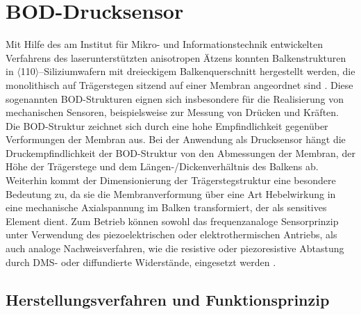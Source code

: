 \section{BOD-Drucksensor}
\label{BOD}


Mit Hilfe des am Institut für Mikro- und Informationstechnik entwickelten
Verfahrens des laserunterstützten anisotropen Ätzens \cite{Ala91} konnten
Balkenstrukturen
in $\langle$110$\rangle$--Siliziumwafern mit dreieckigem Balkenquerschnitt
hergestellt werden, die monolithisch auf Trägerstegen sitzend auf einer
Membran angeordnet sind \cite{Sch93b}. Diese sogenannten BOD-Strukturen
eignen sich insbesondere für die Realisierung von mechanischen Sensoren,
beispielsweise zur Messung von Drücken und Kräften.
Die BOD-Struktur zeichnet sich durch eine hohe Empfindlichkeit gegenüber
Verformungen der Membran aus. Bei der Anwendung als Drucksensor hängt die
Druckempfindlichkeit der BOD-Struktur von den Abmessungen der
Membran, der Höhe der Trägerstege und dem Längen-/Dickenverhältnis des
Balkens ab. Weiterhin kommt der Dimensionierung der Trägerstegstruktur
eine besondere Bedeutung zu, da sie die Membranverformung über eine Art
Hebelwirkung in eine mechanische Axialspannung im Balken transformiert,
der als sensitives Element dient.
Zum Betrieb können sowohl das frequenzanaloge Sensorprinzip unter
Verwendung des piezoelektrischen oder elektrothermischen Antriebs,
als auch analoge Nachweisverfahren, wie die resistive
oder piezoresistive Abtastung durch DMS- oder diffundierte Widerstände,
eingesetzt werden \cite{Ala93}.



\subsection{Herstellungsverfahren und Funktionsprinzip}
\label{bodherstellung}


